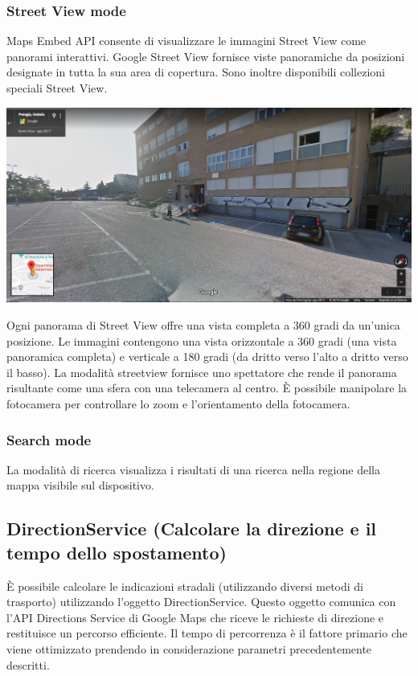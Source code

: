 \documentclass[]{scrartcl}
\begin{document}
\subsubsection{Street View mode}
Maps Embed API consente di visualizzare le immagini Street View come panorami interattivi. Google Street View fornisce viste panoramiche da posizioni designate in tutta la sua area di copertura. Sono inoltre disponibili collezioni speciali Street View.\\
\begin{center}
	\includegraphics[width=0.9\linewidth]{dipartStreetView}
\end{center}
Ogni panorama di Street View offre una vista completa a 360 gradi da un'unica posizione. Le immagini contengono una vista orizzontale a 360 gradi (una vista panoramica completa) e verticale a 180 gradi (da dritto verso l'alto a dritto verso il basso). La modalità streetview fornisce uno spettatore che rende il panorama risultante come una sfera con una telecamera al centro. È possibile manipolare la fotocamera per controllare lo zoom e l'orientamento della fotocamera.
\subsubsection{Search mode}
La modalità di ricerca visualizza i risultati di una ricerca nella regione della mappa visibile sul dispositivo.
\subsection{DirectionService (Calcolare la direzione e il tempo dello spostamento)}
È possibile calcolare le indicazioni stradali (utilizzando diversi metodi di trasporto) utilizzando l'oggetto DirectionService. Questo oggetto comunica con l'API Directions Service di Google Maps che riceve le richieste di direzione e restituisce un percorso efficiente. Il tempo di percorrenza è il fattore primario che viene ottimizzato prendendo in considerazione parametri precedentemente descritti.
\end{document}
